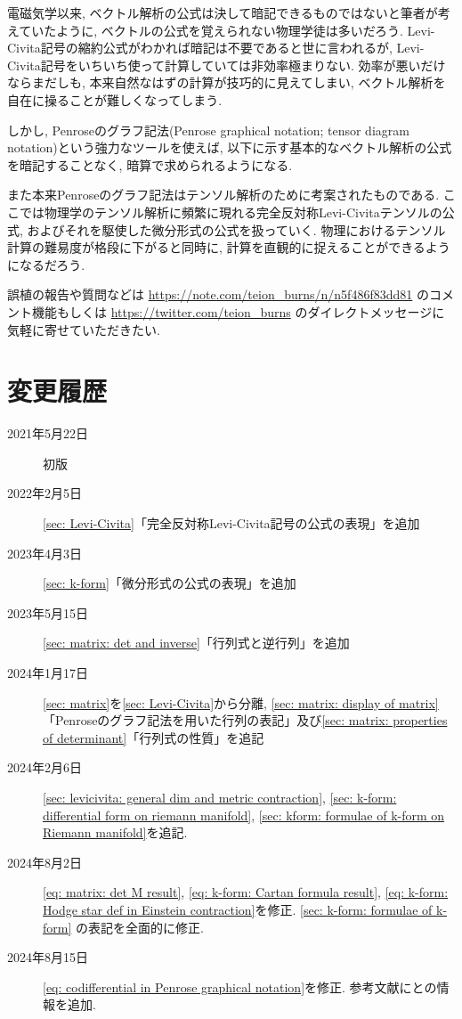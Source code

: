 \documentclass[dvipdfmx]{jsarticle}
\begin{document}
\maketitle

電磁気学以来, ベクトル解析の公式は決して暗記できるものではないと筆者が考えていたように, ベクトルの公式を覚えられない物理学徒は多いだろう.
Levi-Civita記号の縮約公式がわかれば暗記は不要であると世に言われるが, Levi-Civita記号をいちいち使って計算していては非効率極まりない.
効率が悪いだけならまだしも, 本来自然なはずの計算が技巧的に見えてしまい, ベクトル解析を自在に操ることが難しくなってしまう.

しかし, Penroseのグラフ記法(Penrose graphical notation; tensor diagram notation)という強力なツールを使えば, 以下に示す基本的なベクトル解析の公式を暗記することなく, 暗算で求められるようになる.

また本来Penroseのグラフ記法はテンソル解析のために考案されたものである.
ここでは物理学のテンソル解析に頻繁に現れる完全反対称Levi-Civitaテンソルの公式, およびそれを駆使した微分形式の公式を扱っていく.
物理におけるテンソル計算の難易度が格段に下がると同時に, 計算を直観的に捉えることができるようになるだろう.

誤植の報告や質問などは
\url{https://note.com/teion_burns/n/n5f486f83dd81}
のコメント機能もしくは
\url{https://twitter.com/teion_burns}
のダイレクトメッセージに気軽に寄せていただきたい.


\section*{変更履歴}
\begin{description}
    \item[2021年5月22日] 初版
    \item[2022年2月5日] \ref{sec: Levi-Civita}「完全反対称Levi-Civita記号の公式の表現」を追加
    \item[2023年4月3日] \ref{sec: k-form}「微分形式の公式の表現」を追加
    \item[2023年5月15日] \ref{sec: matrix: det and inverse}「行列式と逆行列」を追加
    \item[2024年1月17日] \ref{sec: matrix}を\ref{sec: Levi-Civita}から分離, \ref{sec: matrix: display of matrix}「Penroseのグラフ記法を用いた行列の表記」及び\ref{sec: matrix: properties of determinant}「行列式の性質」を追記
    \item[2024年2月6日] \ref{sec: levicivita: general dim and metric contraction}, \ref{sec: k-form: differential form on riemann manifold}, \ref{sec: kform: formulae of k-form on Riemann manifold}を追記.
    \item[2024年8月2日] \eqref{eq: matrix: det M result}, \eqref{eq: k-form: Cartan formula result}, \eqref{eq: k-form: Hodge star def in Einstein contraction}を修正. \ref{sec: k-form: formulae of k-form} の表記を全面的に修正.
    \item[2024年8月15日] \eqref{eq: codifferential in Penrose graphical notation}を修正. 参考文献に\cite{Penrose and Rindler}と\cite{boosting}の情報を追加.
\end{description}
\end{document}
